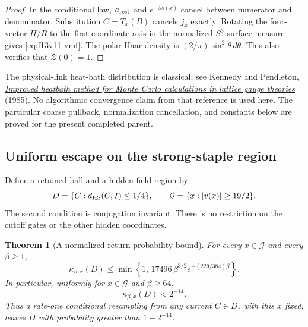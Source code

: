 \documentclass[11pt,oneside]{article}
\newtheorem{theorem}{Theorem}[section]
\begin{document}
\begin{proof}
In the conditional law, \(a_{\rm rest}\) and
\(e^{-\beta s(x)}\) cancel between numerator and
denominator. Substitution \(C=T_x(B)\) cancels \(j_x\)
exactly. Rotating the four-vector \(H/R\) to the
first coordinate axis in the normalized \(S^3\)
surface measure gives \eqref{eq:f13v11-vmf}.
The polar Haar density is
\((2/\pi)\sin^2\theta\,d\theta\). This also verifies
that \(\mathcal Z(0)=1\).
\end{proof}

The physical-link heat-bath distribution is classical;
see Kennedy and Pendleton,
\href{https://www.sciencedirect.com/science/article/pii/0370269385916326}
{\emph{Improved heatbath method for Monte Carlo
calculations in lattice gauge theories}} (1985).
No algorithmic convergence claim from that reference
is used here. The particular coarse pullback,
normalization cancellation, and constants below
are proved for the present completed parent.

\subsection{Uniform escape on the strong-staple region}

Define a retained ball and a hidden-field region by
\[
 D=\{C:d_{\rm HS}(C,I)\le1/4\},\qquad
 \mathcal G=\{x:|v(x)|\ge19/2\}.
\]
The second condition is conjugation invariant.
There is no restriction on the cutoff gates or the
other hidden coordinates.

\begin{theorem}[A normalized return-probability bound]
\label{thm:f13v11-return}
For every \(x\in\mathcal G\) and every \(\beta\ge1\),
\begin{equation}\label{eq:f13v11-return}
 \kappa_{\beta,x}(D)
 \le \min\left\{1,\,
       17496\,\beta^{3/2}e^{-(229/384)\beta}\right\}.
\end{equation}
In particular, uniformly for \(x\in\mathcal G\)
and \(\beta\ge64\),
\[
              \kappa_{\beta,x}(D)<2^{-14}.
\]
Thus a rate-one conditional resampling from any
current \(C\in D\), with this \(x\) fixed, leaves
\(D\) with probability greater than \(1-2^{-14}\).
\end{theorem}
\end{document}
